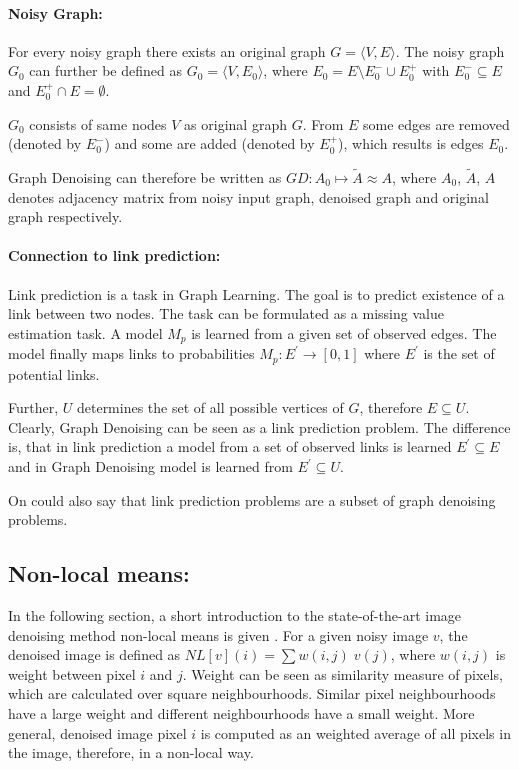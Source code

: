 \paragraph{Noisy Graph:}
For every noisy graph there exists an original graph $G = \langle V,E \rangle$.
The noisy graph $G_0$ can further be defined as $G_0 = \langle V, E_0 \rangle$,  
 where $E_0 = E \setminus  E^{-}_0 \cup  E^{+}_0$ with $E^{-}_0 \subseteq E$ and $E^{+}_0 \cap E = \emptyset$.

$G_0$ consists of same nodes $V$ as original graph $G$. 
From $E$ some edges are removed (denoted by $E^{-}_0$) and some are added
(denoted by $E^{+}_0$), which results is edges $E_0$.

Graph Denoising can therefore be written as $GD: A_0 \mapsto \tilde{A} \approx A$,
where $A_0$, $\tilde{A}$, $A$ denotes adjacency matrix from noisy input graph, denoised graph and original graph respectively.


\paragraph{Connection to link prediction:}
Link prediction is a task in Graph Learning. 
The goal is to predict existence of a link between two nodes.
The task can be formulated as a missing value estimation task. A model $M_p$ is learned
from a given set of observed edges. The model finally maps links to probabilities
$M_p : E^{\prime} \rightarrow [0,1]$ where $E^{\prime}$ is the set of potential links.

Further, $U$ determines the set of all possible vertices of $G$, therefore $E \subseteq U$.
Clearly, Graph Denoising can be seen as a link prediction problem.
The difference is, that in link prediction a model from a set of observed links is learned
$E^{\prime} \subseteq E$ and in Graph Denoising model is learned from 
$E^{\prime} \subseteq U$. 

\begin{tcolorbox}[colback=red!5!white,colframe=red!75!black]
    On could also say that link prediction problems are a subset of graph denoising problems.
\end{tcolorbox}

\subsection{Non-local means:}
In the following section, a short introduction to the 
state-of-the-art image denoising method non-local means is given \cite{noneLocalMean}.
For a given noisy image $v$, the denoised image is defined as $NL[v](i) = \sum{w(i,j) \; v(j)}$,
where $w(i,j)$ is weight between pixel $i$ and $j$. 
Weight can be seen as similarity measure of pixels, which are calculated over square neighbourhoods.
Similar pixel neighbourhoods have a large weight and different neighbourhoods have a small weight.
More general, denoised image pixel $i$ is computed as an weighted average of all pixels in the 
image, therefore, in a non-local way.


